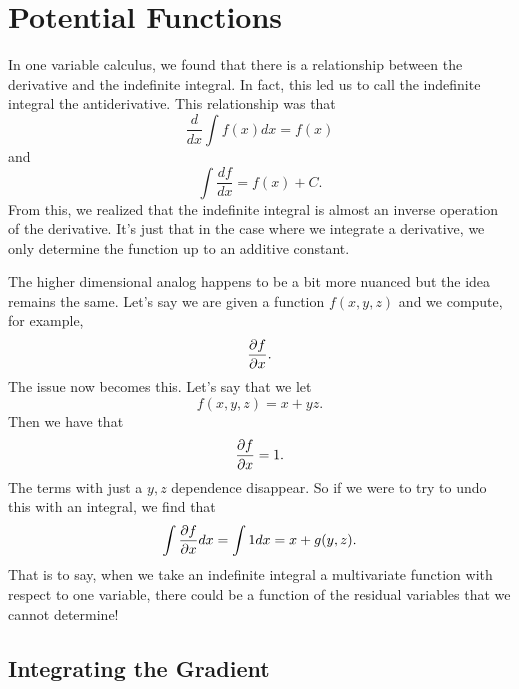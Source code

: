 
      \section{Potential Functions}

                   	        In one variable calculus, we found that there is a relationship between the derivative and the indefinite integral.  In fact, this led us to call the indefinite integral the antiderivative.  This relationship was that
                   	        \[
                   	        \frac{d}{dx}\int f(x)dx = f(x)
                   	        \]
                   	        and
                   	        \[
                   	        \int \frac{df}{dx} = f(x) + C.
                   	        \]
                   	        From this, we realized that the indefinite integral is almost an inverse operation of the derivative.  It's just that in the case where we integrate a derivative, we only determine the function up to an additive constant.


                   	        The higher dimensional analog happens to be a bit more nuanced but the idea remains the same. Let's say we are given a function $f(x,y,z)$ and we compute, for example,
                   	        \[
                   	        \frac{\partial f}{\partial x}.
                   	        \]
                   	        The issue now becomes this.  Let's say that we let
                   	        \[
                   	        f(x,y,z) = x+yz.
                   	        \]
                   	        Then we have that
                   	        \[
                   	        \frac{\partial f}{\partial x} = 1.
                   	        \]
                   	        The terms with just a $y,z$ dependence disappear.  So if we were to try to undo this with an integral, we find that
                   	        \[
                   	        \int \frac{\partial f}{\partial x} dx = \int 1 dx = x + g(y,z).
                   	        \]
                   	        That is to say, when we take an indefinite integral a multivariate function with respect to one variable, there could be a function of the residual variables that we cannot determine!

                   	        \subsection{Integrating the Gradient}

